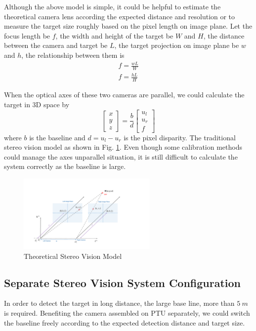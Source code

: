 Although the above model is simple, it could be helpful to estimate the theoretical camera lens according the expected distance and resolution or to measure the target size roughly based on the pixel length on image plane. Let the focus length be $f$, the width and height of the target be $W$ and $H$, the distance between the camera and target be $L$, the target projection on image plane be $w$ and $h$, the relationship between them is  
\begin{align}
f=\frac{wL}{W} \\
f=\frac{hL}{H}
\end{align}

When the optical axes of these two cameras are parallel, we could calculate the target in 3D space by
\begin{equation}
\left[ {\begin{array}{*{20}{c}}
	x \\ 
	y \\ 
	z 
	\end{array}} \right] =\frac{b}{d} \left[ {\begin{array}{*{20}{c}}
	u_l \\ 
	u_r \\ 
	f 
	\end{array}} \right]
\end{equation}
where $b$ is the baseline and $d=u_l-u_r$ is the pixel disparity. The traditional stereo vision model as shown in Fig. \ref{fig:chp03_vision_20_basic_stereo}. Even though some calibration methods could manage the axes unparallel situation, it is still difficult to calculate the system correctly as the baseline is large.

\begin{figure}[!tb]
	\centering
	\includegraphics[width=0.6\textwidth]{figs/chp03_vision_20_basic_stereo.pdf}	
	\caption{Theoretical Stereo Vision Model}
	\label{fig:chp03_vision_20_basic_stereo}
\end{figure}

\subsection{Separate Stereo Vision System Configuration}
In order to detect the target in long distance, the large base line, more than $5\ m $ is required. Benefiting the camera assembled on PTU separately, we could switch the baseline freely according to the expected detection distance and target size.

